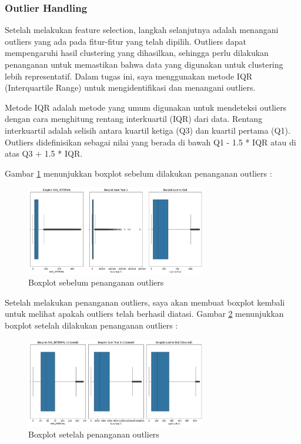 \subsubsection{Outlier Handling}
Setelah melakukan feature selection, langkah selanjutnya adalah menangani outliers yang ada pada fitur-fitur yang telah dipilih. Outliers dapat mempengaruhi hasil clustering yang dihasilkan, sehingga perlu dilakukan penanganan untuk memastikan bahwa data yang digunakan untuk clustering lebih representatif. Dalam tugas ini, saya menggunakan metode IQR (Interquartile Range) untuk mengidentifikasi dan menangani outliers. 

Metode IQR adalah metode yang umum digunakan untuk mendeteksi outliers dengan cara menghitung rentang interkuartil (IQR) dari data. Rentang interkuartil adalah selisih antara kuartil ketiga (Q3) dan kuartil pertama (Q1). Outliers didefinisikan sebagai nilai yang berada di bawah Q1 - 1.5 * IQR atau di atas Q3 + 1.5 * IQR.

Gambar \ref{fig:outlier_handling} menunjukkan boxplot sebelum dilakukan penanganan outliers :

\begin{figure}[H]
    \centering
    \includegraphics[width=0.7\textwidth]{gambar/outlier.png}
    \caption{Boxplot sebelum penanganan outliers}
    \label{fig:outlier_handling}
\end{figure}

Setelah melakukan penanganan outliers, saya akan membuat boxplot kembali untuk melihat apakah outliers telah berhasil diatasi. Gambar \ref{fig:outlier_handling_after} menunjukkan boxplot setelah dilakukan penanganan outliers :

\begin{figure}[H]
    \centering
    \includegraphics[width=0.7\textwidth]{gambar/clean.png}
    \caption{Boxplot setelah penanganan outliers}
    \label{fig:outlier_handling_after}
\end{figure}

